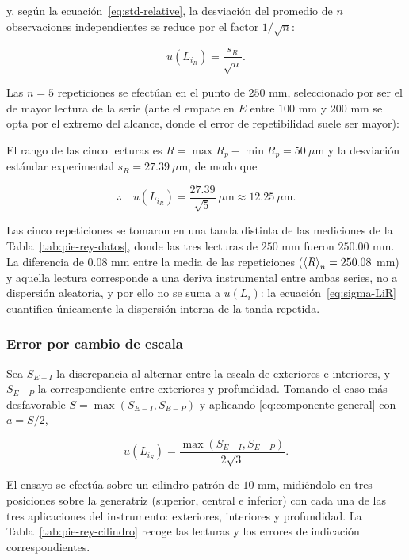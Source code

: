y, según la ecuación~\eqref{eq:std-relative}, la desviación del promedio de $n$
observaciones independientes se reduce por el factor $1/\sqrt{n}$:

\begin{equation}
    u(L_{i_R}) = \frac{s_R}{\sqrt{n}} .
    \label{eq:sigma-LiR}
\end{equation}

Las $n = 5$ repeticiones se efectúan en el punto de $250$ mm, seleccionado por ser
el de mayor lectura de la serie (ante el empate en $E$ entre $100$ mm y $200$ mm se
opta por el extremo del alcance, donde el error de repetibilidad suele ser mayor):



El rango de las cinco lecturas es $R = \max R_p - \min R_p = 50\ \mu\text{m}$ y la
desviación estándar experimental $s_R = 27.39\ \mu\text{m}$, de modo que

\begin{equation}
    \therefore\quad u(L_{i_R}) = \frac{27.39}{\sqrt{5}}\ \mu\text{m}
    \approx 12.25\ \mu\text{m}.
    \label{eq:sigma-LiR-valor}
\end{equation}

Las cinco repeticiones se tomaron en una tanda distinta de las mediciones de la
Tabla~\ref{tab:pie-rey-datos}, donde las tres lecturas de $250$ mm fueron
$250.00$ mm. La diferencia de $0.08$ mm entre la media de las repeticiones
($\left\langle R \right\rangle_n = 250.08$ mm) y aquella lectura corresponde a una deriva instrumental
entre ambas series, no a dispersión aleatoria, y por ello no se suma a
$u(L_i)$: la ecuación~\eqref{eq:sigma-LiR} cuantifica únicamente la dispersión
interna de la tanda repetida.

\subsubsection*{Error por cambio de escala}

Sea $S_{E-I}$ la discrepancia al alternar entre la escala de exteriores e interiores,
y $S_{E-P}$ la correspondiente entre exteriores y profundidad. Tomando el caso más
desfavorable $S = \max(S_{E-I}, S_{E-P})$ y aplicando
\eqref{eq:componente-general} con $a = S/2$,

\begin{equation}
    u(L_{i_S}) = \frac{\max(S_{E-I}, S_{E-P})}{2\sqrt{3}} .
    \label{eq:sigma-LiS}
\end{equation}

El ensayo se efectúa sobre un cilindro patrón de $10$ mm, midiéndolo en tres
posiciones sobre la generatriz (superior, central e inferior) con cada una de las
tres aplicaciones del instrumento: exteriores, interiores y profundidad. La
Tabla~\ref{tab:pie-rey-cilindro} recoge las lecturas y los errores de indicación
correspondientes.

